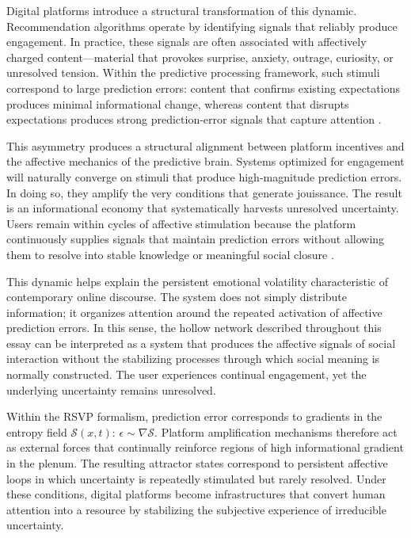 \documentclass[12pt,a4paper]{article}
\begin{document}
Digital platforms introduce a structural transformation of this dynamic. Recommendation
algorithms operate by identifying signals that reliably produce engagement. In practice, these
signals are often associated with affectively charged content---material that provokes surprise,
anxiety, outrage, curiosity, or unresolved tension. Within the predictive processing framework,
such stimuli correspond to large prediction errors: content that confirms existing expectations
produces minimal informational change, whereas content that disrupts expectations produces
strong prediction-error signals that capture attention \citep{friston2010}.

This asymmetry produces a structural alignment between platform incentives and the affective
mechanics of the predictive brain. Systems optimized for engagement will naturally converge on
stimuli that produce high-magnitude prediction errors. In doing so, they amplify the very
conditions that generate jouissance. The result is an informational economy that systematically
harvests unresolved uncertainty. Users remain within cycles of affective stimulation because
the platform continuously supplies signals that maintain prediction errors without allowing them
to resolve into stable knowledge or meaningful social closure \citep{vosoughi2018,zuboff2019}.

This dynamic helps explain the persistent emotional volatility characteristic of contemporary
online discourse. The system does not simply distribute information; it organizes attention
around the repeated activation of affective prediction errors. In this sense, the hollow
network described throughout this essay can be interpreted as a system that produces the
affective signals of social interaction without the stabilizing processes through which social
meaning is normally constructed. The user experiences continual engagement, yet the underlying
uncertainty remains unresolved.

Within the RSVP formalism, prediction error corresponds to gradients in the entropy field
$\mathcal{S}(x,t)$: $\epsilon \sim \nabla\mathcal{S}$. Platform amplification mechanisms
therefore act as external forces that continually reinforce regions of high informational
gradient in the plenum. The resulting attractor states correspond to persistent affective loops
in which uncertainty is repeatedly stimulated but rarely resolved. Under these conditions,
digital platforms become infrastructures that convert human attention into a resource by
stabilizing the subjective experience of irreducible uncertainty.
\end{document}
